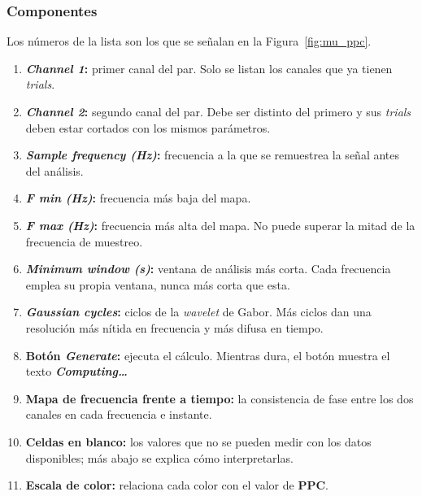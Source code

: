 \documentclass[11pt,a4paper]{article}
\begin{document}
    \subsubsection*{Componentes}
    Los n\'umeros de la lista son los que se se\~nalan en la Figura~\ref{fig:mu_ppc}.
    \begin{enumerate}[label=(\arabic*)]
        \item \textbf{\textit{Channel 1}:} primer canal del par. Solo se listan los canales que ya tienen \textit{trials}.
        \item \textbf{\textit{Channel 2}:} segundo canal del par. Debe ser distinto del primero y sus \textit{trials} deben estar cortados con los mismos par\'ametros.
        \item \textbf{\textit{Sample frequency (Hz)}:} frecuencia a la que se remuestrea la se\~nal antes del an\'alisis.
        \item \textbf{\textit{F min (Hz)}:} frecuencia m\'as baja del mapa.
        \item \textbf{\textit{F max (Hz)}:} frecuencia m\'as alta del mapa. No puede superar la mitad de la frecuencia de muestreo.
        \item \textbf{\textit{Minimum window (s)}:} ventana de an\'alisis m\'as corta. Cada frecuencia emplea su propia ventana, nunca m\'as corta que esta.
        \item \textbf{\textit{Gaussian cycles}:} ciclos de la \textit{wavelet} de Gabor. M\'as ciclos dan una resoluci\'on m\'as n\'itida en frecuencia y m\'as difusa en tiempo.
        \item \textbf{Bot\'on \textit{Generate}:} ejecuta el c\'alculo. Mientras dura, el bot\'on muestra el texto \textbf{\textit{Computing\ldots}}
        \item \textbf{Mapa de frecuencia frente a tiempo:} la consistencia de fase entre los dos canales en cada frecuencia e instante.
        \item \textbf{Celdas en blanco:} los valores que no se pueden medir con los datos disponibles; m\'as abajo se explica c\'omo interpretarlas.
        \item \textbf{Escala de color:} relaciona cada color con el valor de \textbf{PPC}.
    \end{enumerate}
\end{document}
